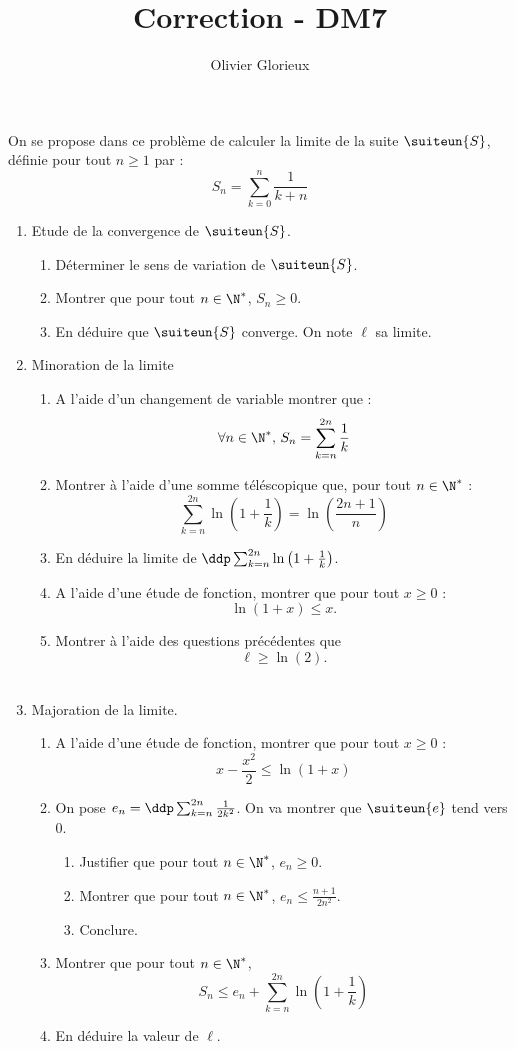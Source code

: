 \documentclass[a4paper, 11pt,reqno]{article}
\author{Olivier Glorieux}
\begin{document}
\title{Correction - DM7
}
\begin{probleme}
On se propose dans ce problème de calculer la limite de la  suite $\suiteun{S}$, définie pour tout $n\geq 1$ par : 
$$S_n=\sum_{k=0}^{n} \frac{1}{k+n}$$


\begin{enumerate}
\item Etude de la convergence de $\suiteun{S}$.
\begin{enumerate}
\item  Déterminer le sens de variation de $\suiteun{S}$.
\item Montrer que pour tout $n\in \N^*$, $S_n \geq 0$.
\item En déduire que $\suiteun{S}$ converge.  On note $\ell $ sa limite. 
\end{enumerate}

\item   Minoration de la limite
\begin{enumerate}

\item A l'aide d'un changement de variable montrer que : 
$$\forall n\in \N^*,\,  S_n  =\sum_{k=n}^{2n}\frac1{k}$$
\item Montrer à l'aide d'une somme téléscopique que, pour tout $n\in\N^*$ :
$$\sum_{k=n}^{2n} \ln\left( 1 +\frac{1}{k}\right) =\ln\left(\frac{2n+1}{n}\right) $$

\item En déduire la limite de $\ddp \sum_{k=n}^{2n}\ln\left( 1 +\frac{1}{k}\right)$.

\item A l'aide d'une étude de fonction,  montrer que pour tout $x\geq 0 $ :
$$ \ln (1+x) \leq x.$$


\item Montrer à l'aide des questions précédentes que $$\ell \geq \ln(2).$$\\ 
\end{enumerate}
\item Majoration de la limite.
\begin{enumerate}
\item A l'aide d'une étude de fonction,  montrer que pour tout $x\geq 0 $ :
$$x-\frac{x^2}{2} \leq  \ln (1+x)$$
\item On pose $e_n  =\ddp \sum_{k=n}^{2n} \frac{1}{2k^2}$. On va montrer que $\suiteun{e}$ tend vers $0$. 
\begin{enumerate}
\item Justifier que pour tout $n\in \N^*$, $e_n \geq 0$.
\item Montrer que pour tout $n\in \N^*$, $e_n \leq \frac{n+1}{2n^2}$.
\item Conclure. 
\end{enumerate}
\item Montrer que pour tout $n\in \N^*$,  
$$S_n \leq e_n + \sum_{k=n}^{2n}\ln\left( 1 +\frac{1}{k}\right)$$
\item En déduire la valeur de $\ell$. 

\end{enumerate}

\end{enumerate}


\end{probleme}
\end{document}
